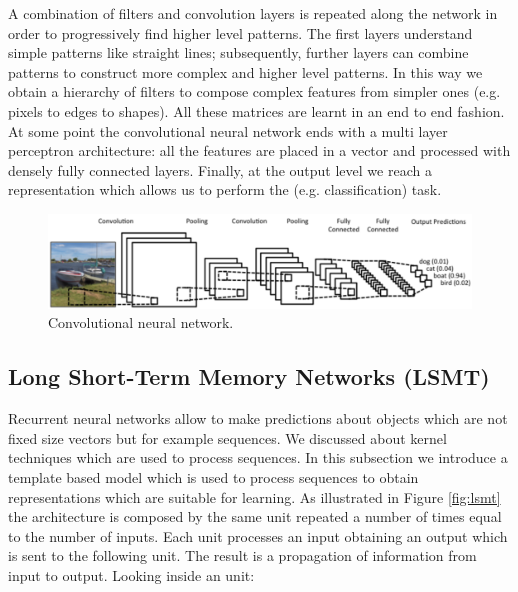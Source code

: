 A combination of filters and convolution layers is repeated along the network in
order to progressively find higher level patterns. The first layers understand
simple patterns like straight lines; subsequently, further layers can combine
patterns to construct more complex and higher level patterns. In this way we obtain
a hierarchy of filters to compose complex features from simpler ones (e.g. pixels
to edges to shapes). All these matrices are learnt in an end to end fashion. \\
At some point the convolutional neural network ends with a multi layer
perceptron architecture: all the features are placed in a vector and processed with
densely fully connected layers. Finally, at the output level we reach a representation
which allows us to perform the (e.g. classification) task.

\begin{figure}[H]
	\centering
	\includegraphics[width=\textwidth]{
		images/16_DeepLearning_convolutionalNeuralNetwork.png
	}
	\caption{Convolutional neural network.}
	\label{fig:cnn}
\end{figure}

\subsection{Long Short-Term Memory Networks (LSMT)}
Recurrent neural networks allow to make predictions about objects which are not fixed
size vectors but for example sequences. We discussed about kernel techniques
which are used to process sequences. In this subsection we introduce a template based
model which is used to process sequences to obtain representations which are suitable
for learning. As illustrated in Figure \ref{fig:lsmt} the architecture is
composed by the same unit repeated a number of times equal to the number of
inputs. Each unit processes an input obtaining an output which is sent to the following
unit. The result is a propagation of information from input to output. Looking inside
an unit:

